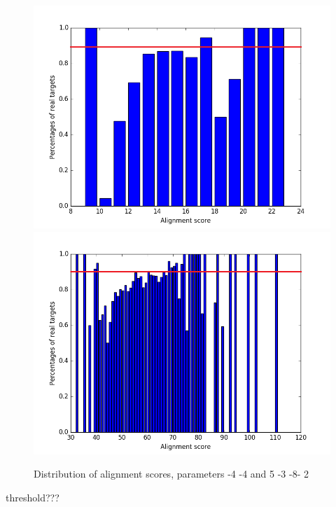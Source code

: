 \documentclass[12pt]{article}
\begin{document}
\begin{figure}[h]
\centering
\includegraphics[scale=0.3]{results/plot_scores-4-4_thresh.png}
\includegraphics[scale=0.3]{results/plot_scores5-3-8-2_thresh.png}
\caption{Distribution of alignment scores, parameters -4 -4 and 5 -3 -8- 2}
\label{fig:distribution}
\end{figure}

threshold??? \\
\end{document}
